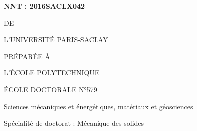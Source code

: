 
\begin{titlepage}

\begin{flushleft}
 \hfill
{}
\end{flushleft}
\vspace{10pt}

\begin{mdframed}
\begin{minipage}[t][22cm][t]{\textwidth}
\begin{flushleft}
\large\textbf{NNT : 2016SACLX042}
\end{flushleft}
\vspace{20pt}

\begin{center}
{\color{color02}{\LARGE THÈSE DE DOCTORAT}

\vspace{8pt}
{\LARGE DE}

\vspace{8pt}
{\LARGE L'UNIVERSITÉ PARIS-SACLAY}

\vspace{8pt}
{\LARGE PRÉPARÉE À}

\vspace{8pt}
{\LARGE L'ÉCOLE POLYTECHNIQUE}}

\vspace{36pt}
{\Large ÉCOLE DOCTORALE N°579}

\vspace{5pt}
{\Large Sciences mécaniques et énergétiques, matériaux et géosciences}

\vspace{16pt}
{\Large Spécialité de doctorat : Mécanique des solides}
\vspace{12pt}


\end{center}
\end{minipage}
\end{mdframed}
\end{titlepage}
